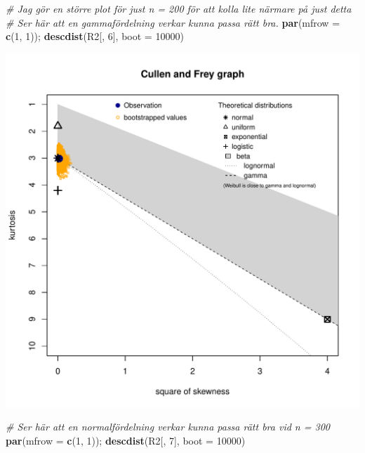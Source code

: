 \documentclass[]{article}
\newenvironment{Shaded}{\begin{snugshade}}{\end{snugshade}}
\newcommand{\KeywordTok}[1]{\textcolor[rgb]{0.13,0.29,0.53}{\textbf{{#1}}}}
\newcommand{\DataTypeTok}[1]{\textcolor[rgb]{0.13,0.29,0.53}{{#1}}}
\newcommand{\DecValTok}[1]{\textcolor[rgb]{0.00,0.00,0.81}{{#1}}}
\newcommand{\CommentTok}[1]{\textcolor[rgb]{0.56,0.35,0.01}{\textit{{#1}}}}
\newcommand{\NormalTok}[1]{{#1}}
\begin{document}
\begin{Shaded}
\begin{Highlighting}[]
\CommentTok{# Jag gör en större plot för just n = 200 för att kolla lite närmare på just detta}
\CommentTok{# Ser här att en gammafördelning verkar kunna passa rätt bra.}
\KeywordTok{par}\NormalTok{(}\DataTypeTok{mfrow =} \KeywordTok{c}\NormalTok{(}\DecValTok{1}\NormalTok{, }\DecValTok{1}\NormalTok{)); }\KeywordTok{descdist}\NormalTok{(R2[, }\DecValTok{6}\NormalTok{], }\DataTypeTok{boot =} \DecValTok{10000}\NormalTok{)}
\end{Highlighting}
\end{Shaded}

\includegraphics{2016_w09_files/figure-latex/unnamed-chunk-9-2.pdf}

\begin{Shaded}
\begin{Highlighting}[]
\CommentTok{# Ser här att en normalfördelning verkar kunna passa rätt bra vid n = 300}
\KeywordTok{par}\NormalTok{(}\DataTypeTok{mfrow =} \KeywordTok{c}\NormalTok{(}\DecValTok{1}\NormalTok{, }\DecValTok{1}\NormalTok{)); }\KeywordTok{descdist}\NormalTok{(R2[, }\DecValTok{7}\NormalTok{], }\DataTypeTok{boot =} \DecValTok{10000}\NormalTok{)}
\end{Highlighting}
\end{Shaded}
\end{document}
